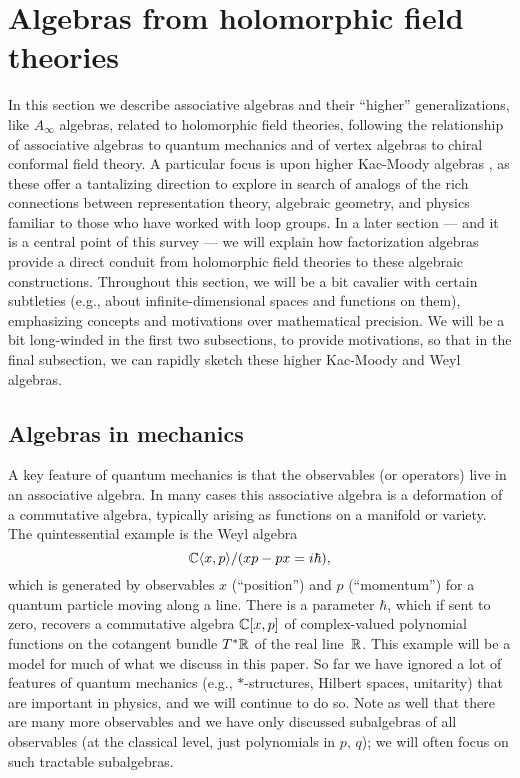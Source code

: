 \documentclass[11pt]{amsart}
\author{Owen Gwilliam and Brian R. Williams}
\date{\today}
\begin{document}

\section{Algebras from holomorphic field theories}

In this section we describe  associative algebras and their ``higher'' generalizations, like $A_\infty$ algebras, related to holomorphic field theories,
following the relationship of associative algebras to quantum mechanics and of vertex algebras to chiral conformal field theory.
A particular focus is upon higher Kac-Moody algebras \cite{FHK},
as these offer a tantalizing direction to explore in search of analogs of the rich connections between representation theory, algebraic geometry, and physics familiar to those who have worked with loop groups.
In a later section --- and it is a central point of this survey --- we will explain how factorization algebras provide a direct conduit from holomorphic field theories to these algebraic constructions.
Throughout this section, we will be a bit cavalier with certain subtleties (e.g., about infinite-dimensional spaces and functions on them), 
emphasizing concepts and motivations over mathematical precision.
We will be a bit long-winded in the first two subsections, to provide motivations,
so that in the final subsection, we can rapidly sketch these higher Kac-Moody and Weyl algebras.

\subsection{Algebras in mechanics}

A key feature of quantum mechanics is that the observables (or operators) live in an associative algebra.
In many cases this associative algebra is a deformation of a commutative algebra, typically arising as functions on a manifold or variety.
The quintessential example is the Weyl algebra
\[
\mathbb C \langle x, p \rangle /(xp - px = i \hbar),
\] 
which is generated by observables $x$ (``position'') and $p$ (``momentum'') for a quantum particle moving along a line.
There is a parameter $\hbar$, which if sent to zero, recovers a commutative algebra $\mathbb C [ x, p ]$ of complex-valued polynomial functions on the cotangent bundle $T^* \mathbb R$ of the real line~$\mathbb R$.
This example will be a model for much of what we discuss in this paper.
So far we have ignored a lot of features of quantum mechanics (e.g., $\ast$-structures, Hilbert spaces, unitarity) that are important in physics,
and we will continue to do so.
Note as well that there are many more observables and we have only discussed subalgebras of all observables (at the classical level, just polynomials in $p$, $q$);
we will often focus on such tractable subalgebras. 
\end{document}

